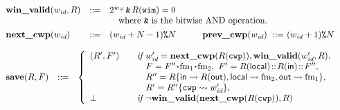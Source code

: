 \begin{figure}[!t]
\[\begin{array}{l}
        \begin{array}{lcl}
            \winvalid(\cwp, \RFile) & \define & 2^{\cwp}
											\,\bitAND\, \RFile(\regwim) = 0								
			\\
             & & \ \ \ \mbox{where $\bitAND$ is the bitwise AND operation.}
            \\
            \\[-8pt]
		    \precwp(\cwp) & \define & (\cwp + N - 1) \modOP N
            \qquad\quad
		    \postcwp(\cwp) \ \define \ (\cwp + 1) \modOP N
        \end{array}
            \\
		    \\ %
        \begin{array}{lcl}
            \decwin(\RFile, \Wstack) & \define &
            \left\{
            \begin{array}{ll}
                (\RFile', \Wstack')
                & \quad \textit{if }
                             \cwp' = \precwp(\RFile(\regcwp)),
                             \winvalid(\cwp', \RFile), \\
                & \quad \ \ \
                             \Wstack = \Wstack'' \lstApp \fm_1 \lstApp \fm_2, \
                              \Wstack' = \RFile(\localRN)
                                          \stCons\RFile(\inRN)\stCons\Wstack'',\\
                & \quad \ \ \ \RFile'' =
                \RFile\{\inRN\rightsquigarrow \RFile(\outRN),
                        \localRN\rightsquigarrow \fm_2,
                        \outRN \rightsquigarrow \fm_1\},
                \\
                 & \quad \ \ \
                            \RFile' = \fsubst{\RFile''}\regcwp{\cwp'},
                 \\
                \perp &\quad \textit{if }
                                  \lnot\winvalid(\precwp(R(\regcwp)), \RFile)
            \end{array}
            \right. \\
            \\[-5pt]


\end{array}
\end{array}\]
\end{figure}
